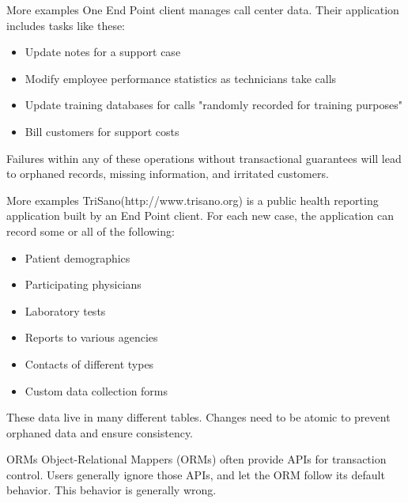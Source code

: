 \documentclass[svgnames]{beamer}
\begin{document}
\begin{frame}{More examples}
    One End Point client manages call center data. Their application includes
    tasks like these:
    \begin{itemize}
        \item Update notes for a support case
        \item Modify employee performance statistics as technicians take calls
        \item Update training databases for calls "randomly recorded for
        training purposes"
        \item Bill customers for support costs
    \end{itemize}
    Failures within any of these operations without transactional guarantees
    will lead to orphaned records, missing information, and irritated
    customers.
\end{frame}
\begin{frame}{More examples}
    TriSano\texttrademark  (http://www.trisano.org) is a public health
    reporting application built by an End Point client. For each new case, the
    application can record some or all of the following:
    \begin{itemize}
        \item Patient demographics
        \item Participating physicians
        \item Laboratory tests
        \item Reports to various agencies
        \item Contacts of different types
        \item Custom data collection forms
    \end{itemize}
    These data live in many different tables. Changes need to be atomic to
    prevent orphaned data and ensure consistency.
\end{frame}

\begin{frame}{ORMs}
    Object-Relational Mappers (ORMs) often provide APIs for transaction
    control. Users generally ignore those APIs, and let the ORM follow its
    default behavior. This behavior is generally wrong.
\end{frame}
\end{document}
